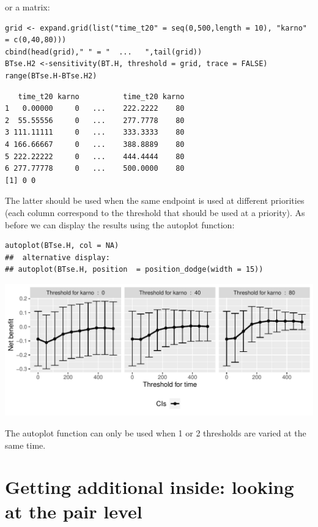 \documentclass[12pt]{article}
\begin{document}
or a matrix:

\lstset{language=r,label= ,caption= ,captionpos=b,numbers=none}
\begin{lstlisting}
grid <- expand.grid(list("time_t20" = seq(0,500,length = 10), "karno" = c(0,40,80)))
cbind(head(grid)," " = "  ...   ",tail(grid))
BTse.H2 <-sensitivity(BT.H, threshold = grid, trace = FALSE)
range(BTse.H-BTse.H2)
\end{lstlisting}

\begin{verbatim}
   time_t20 karno          time_t20 karno
1   0.00000     0   ...    222.2222    80
2  55.55556     0   ...    277.7778    80
3 111.11111     0   ...    333.3333    80
4 166.66667     0   ...    388.8889    80
5 222.22222     0   ...    444.4444    80
6 277.77778     0   ...    500.0000    80
[1] 0 0
\end{verbatim}


The latter should be used when the same endpoint is used at different
priorities (each column correspond to the threshold that should be
used at a priority). As before we can display the results using the
autoplot function:
\lstset{language=r,label= ,caption= ,captionpos=b,numbers=none}
\begin{lstlisting}
autoplot(BTse.H, col = NA)
##  alternative display:
## autoplot(BTse.H, position  = position_dodge(width = 15))
\end{lstlisting}

\begin{center}
\includegraphics[width=\textwidth]{./figures/gg-sensitivity2.pdf}
\end{center}

The autoplot function can only be used when 1 or 2 thresholds are
varied at the same time.
\clearpage

\section{Getting additional inside: looking at the pair level}
\label{sec:orgf139efe}
\end{document}
